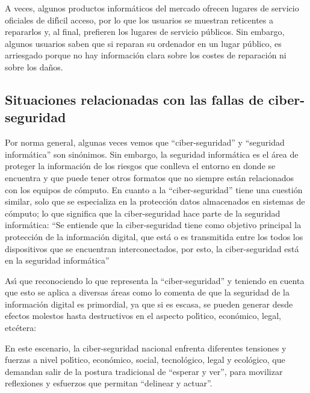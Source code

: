 \begin{displayquote}
	A veces, algunos productos inform\'aticos del mercado ofrecen lugares de
	servicio oficiales de dif\'{\i}cil acceso, por lo que los usuarios se muestran
	reticentes a repararlos y, al final, prefieren los lugares de servicio
	p\'ublicos. Sin embargo, algunos usuarios saben que si reparan su ordenador en
	un lugar p\'ublico, es arriesgado porque no hay informaci\'on clara sobre los
	costes de reparaci\'on ni sobre los da\~nos.
\end{displayquote}

\subsection{Situaciones relacionadas con las fallas de ciber-seguridad}

Por norma general, algunas veces vemos que ``ciber-seguridad'' y ``seguridad
inform\'atica'' son sin\'onimos. Sin embargo, la seguridad inform\'atica es el \'area de
proteger la informaci\'on de los riesgos que conlleva el entorno en donde se
encuentra y que puede tener otros formatos que no siempre est\'an relacionados
con los equipos de c\'omputo. En cuanto a la ``ciber-seguridad'' tiene una cuesti\'on
similar, solo que se especializa en la protecci\'on datos almacenados en sistemas
de c\'omputo; lo que significa que la ciber-seguridad hace parte de la seguridad
inform\'atica: ``Se entiende que la ciber-seguridad tiene como objetivo
principal la protecci\'on de la informaci\'on digital, que est\'a o es transmitida
entre los todos los dispositivos que se encuentran interconectados, por esto,
la ciber-seguridad est\'a en la seguridad inform\'atica''
\parencite{Mosquera2019}

As\'{\i} que reconociendo lo que representa la ``ciber-seguridad'' y teniendo en
cuenta que esto se aplica a diversas \'areas como lo comenta
\textcite{CanoMartinez2022} de que la seguridad de la informaci\'on digital es
primordial, ya que si es escasa, se pueden generar desde efectos molestos hasta
destructivos en el aspecto pol\'{\i}tico, econ\'omico, legal, etc\'etera:

\begin{displayquote}
	En este escenario, la ciber-seguridad nacional enfrenta diferentes tensiones y
	fuerzas a nivel pol\'{\i}tico, econ\'omico, social, tecnol\'ogico, legal y ecol\'ogico,
	que demandan salir de la postura tradicional de “esperar y ver”, para
	movilizar reflexiones y esfuerzos que permitan “delinear y actuar”.
\end{displayquote}

